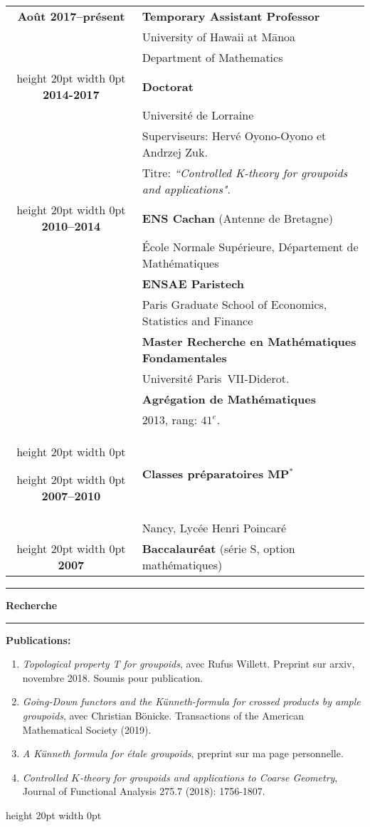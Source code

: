 \documentclass[a4paper,11pt]{article}
\newcommand\espace{\vrule height 20pt width 0pt}
\newcommand{\titre}[1]{%
	\begin{center}
	\bigskip
	\rule{\textwidth}{1pt}
	\par\vspace{0.1cm}
        \textbf{\large #1}
	\par\rule{\textwidth}{1pt}
	\end{center}
	\bigskip
	}
\begin{document}
\begin{tabular}{cp{}}

\textbf{Ao\^{u}t 2017--pr\'esent} &  \textbf{Temporary Assistant Professor} \\	
					& University of Hawaii at M\={a}noa  \\
						& Department of Mathematics\\
\espace
\textbf{2014-2017} &  \textbf{Doctorat} \\
			& Universit\'e de Lorraine \\
			& Superviseurs: Hervé Oyono-Oyono et Andrzej Zuk.\\ 
						& Titre: \textit{``Controlled K-theory for groupoids and applications"}. \\
\espace
\textbf{2010--2014} &  \textbf{ENS Cachan} (Antenne de Bretagne) \\
				    & 	\'Ecole Normale Supérieure, D\'epartement de Math\'ematiques \\
                              & \textbf{ENSAE Paristech}\\
				   & Paris Graduate School of Economics, Statistics and Finance\\
                                   & \textbf{Master Recherche en Math\'ematiques Fondamentales}\\  & Universit\'e Paris~VII-Diderot. \\
                                   & \textbf{Agrégation de Mathématiques} \\
				& 2013, rang: $41^e$. \\
\espace

\espace
\textbf{2007--2010} &\textbf{Classes préparatoires MP$^*$ } \\
					& Nancy, Lycée Henri Poincaré\\

\espace
\textbf{2007} & \textbf{Baccalauréat} (série S, option math\'ematiques) 
 \\

\end{tabular}

\newpage
\titre{Recherche}

\textbf{Publications:} 
\begin{enumerate}
\item \textit{Topological property T for groupoids}, avec Rufus Willett. Preprint sur arxiv, novembre 2018. Soumis pour publication.
\item \textit{Going-Down functors and the Künneth-formula for crossed products by ample groupoids}, avec Christian Bönicke. Transactions of the American Mathematical Society (2019).
\item \textit{A K\"{u}nneth formula for \'etale groupoids}, preprint sur ma page personnelle.
\item \textit{Controlled $K$-theory for groupoids and applications to Coarse Geometry}, Journal of Functional Analysis 275.7 (2018): 1756-1807.
\end{enumerate}
\espace
\end{document}
